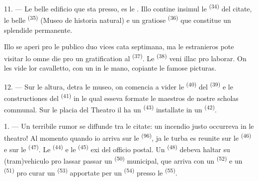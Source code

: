 \VUsaut{4.0mm}
\VUsaut{3.4mm}

11. --- Le belle edificio que sta presso, es le . Illo contine
insimul le  \textsuperscript{(34)} del citate, le belle
 \textsuperscript{(35)} (Museo de
historia natural) e un gratiose 
\textsuperscript{(36)} que constitue un splendide 
permanente.

Illo se aperi pro le publico duo vices cata septimana, ma le estranieros pote
visitar lo omne die pro un gratification al 
\textsuperscript{(37)}. Le  \textsuperscript{(38)} veni illac
pro laborar. On les vide  lor cavalletto, con un 
in le mano, copiante le famose picturas.

12. --- Sur le altura, detra le museo, on comencia a vider le 
\textsuperscript{(40)} del  \textsuperscript{(39)} e le
constructiones del  \textsuperscript{(41)} in le qual
esseva formate le maestros de nostre scholas communal. Sur le placia del Theatro
il ha un  \textsuperscript{(43)} installate in un
 \textsuperscript{(42)}.

\VUsaut{5.0mm}
\VUsaut{3.0mm}

\VUsaut{3.4mm}

1. --- Un terribile rumor se diffunde tra le citate: un incendio justo occurreva
in le theatro! Al momento quando io arriva sur le 
\textsuperscript{(96)}, ja le turba es reunite sur le 
\textsuperscript{(46)} e sur le  \textsuperscript{(47)}. Le
 \textsuperscript{(44)} e le  \textsuperscript{(45)} exi del officio postal. Un
 \textsuperscript{(48)} debeva haltar su (tram)vehiculo
pro lassar passar un  \textsuperscript{(50)}
municipal, que arriva con un  \textsuperscript{(52)} e un
 \textsuperscript{(51)} pro curar un 
\textsuperscript{(53)} apportate per un 
\textsuperscript{(54)} presso le 
\textsuperscript{(55)}.

